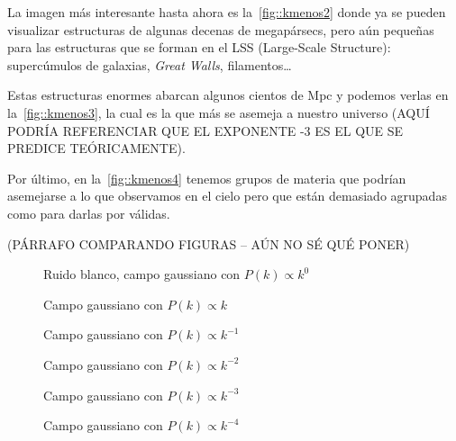 La imagen más interesante hasta ahora es la~\autoref{fig::kmenos2} donde ya se pueden visualizar estructuras de algunas decenas de megapársecs, pero aún pequeñas para las estructuras que se forman en el LSS (Large-Scale Structure): supercúmulos de galaxias, \textit{Great Walls}, filamentos\dots

Estas estructuras enormes abarcan algunos cientos de Mpc y podemos verlas en la~\autoref{fig::kmenos3}, la cual es la que más se asemeja a nuestro universo (AQUÍ PODRÍA REFERENCIAR QUE EL EXPONENTE -3 ES EL QUE SE PREDICE TEÓRICAMENTE).

Por último, en la~\autoref{fig::kmenos4} tenemos grupos de materia que podrían asemejarse a lo que observamos en el cielo pero que están demasiado agrupadas como para darlas por válidas.

(PÁRRAFO COMPARANDO FIGURAS -- AÚN NO SÉ QUÉ PONER)
\begin{figure}
  \centering
  {}
  \caption{Ruido blanco, campo gaussiano con \(P(k)\propto k^0\)}
  \label{fig::k0}
\end{figure}
\begin{figure}
  \centering
  {}
  \caption{Campo gaussiano con \(P(k)\propto k\)}
  \label{fig::k1}
\end{figure}
\begin{figure}
  \centering
  {}
  \caption{Campo gaussiano con \(P(k)\propto k^{-1}\)}
  \label{fig::kmenos1}
\end{figure}
\begin{figure}
  \centering
  {}
  \caption{Campo gaussiano con \(P(k)\propto k^{-2}\)}
  \label{fig::kmenos2}
\end{figure}
\begin{figure}
  \centering
  {}
  \caption{Campo gaussiano con \(P(k)\propto k^{-3}\)}
  \label{fig::kmenos3}
\end{figure}
\begin{figure}
  \centering
  {}
  \caption{Campo gaussiano con \(P(k)\propto k^{-4}\)}
  \label{fig::kmenos4}
\end{figure}

